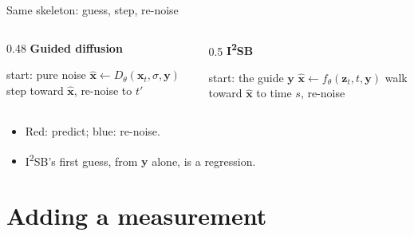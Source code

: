 \documentclass[aspectratio=169, 11pt]{beamer}
\newcommand{\x}{\bm{x}}
\newcommand{\y}{\bm{y}}
\newcommand{\z}{\bm{z}}
\newcommand{\hx}{\hat{\bm{x}}}
\begin{document}
\begin{frame}{Same skeleton: guess, step, re-noise}
\begin{columns}[T]
\begin{column}{0.48\textwidth}
\textbf{Guided diffusion}
\begin{algorithmic}[1]
\State start: pure noise
  \State \textcolor{cmean}{$\hx \gets D_\theta(\x_t,\sigma,\y)$}
  \State \textcolor{ca}{step toward $\hx$, re-noise to $t'$}
\EndFor
\end{algorithmic}
\end{column}
\begin{column}{0.5\textwidth}
\textbf{I\textsuperscript{2}SB}
\begin{algorithmic}[1]
\State start: the guide $\y$
  \State \textcolor{cmean}{$\hx \gets f_\theta(\z_t,t,\y)$}
  \State \textcolor{ca}{walk toward $\hx$ to time $s$, re-noise}
\EndFor
\end{algorithmic}
\end{column}
\end{columns}

\bigskip
\begin{itemize}
  \item \textcolor{cmean}{Red: predict}; \textcolor{ca}{blue: re-noise}.
  \item I\textsuperscript{2}SB's first guess, from $\y$ alone, is a regression.
\end{itemize}
\end{frame}

\section{Adding a measurement}
\end{document}
